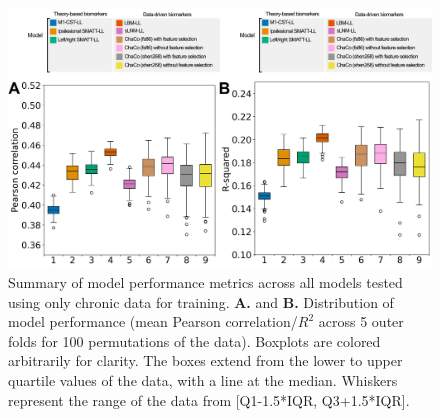 \documentclass[10pt]{article}
\begin{document}
\begin{figure}[htp]
\centering
\includegraphics[width=1\linewidth]{figures/Analysis1_supp.png}
\caption{Summary of model performance metrics across all models tested using only chronic data for training.  \textbf{A.} and \textbf{B.} Distribution of model performance (mean Pearson correlation/$R^2$ across 5 outer folds for 100 permutations of the data).  Boxplots are colored arbitrarily for clarity. The boxes extend from the lower to upper quartile values of the data, with a line at the median. Whiskers represent the range of the data from [Q1-1.5*IQR, Q3+1.5*IQR]. }
\label{analysis1_chronic}
\end{figure}
\end{document}
